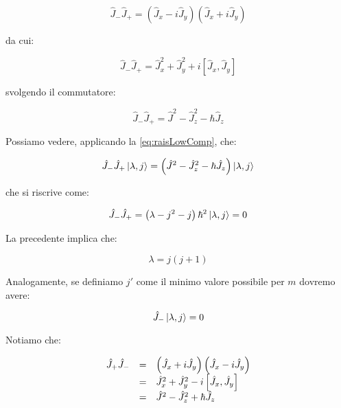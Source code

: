 	\begin{equation}
		\hat{J}_- \hat{J}_+ = \left ( \hat{J}_x - i \hat{J}_y \right ) \left ( \hat{J}_x + i \hat{J}_y \right )
	\end{equation}

da cui:

	\begin{equation}
		\hat{J}_- \hat{J}_+ = \hat{J}^2_x + \hat{J}^2_y + i \left [ \hat{J}_x, \hat{J}_y \right ]
	\end{equation}

svolgendo il commutatore:

	\begin{equation} \label{eq:raisLowComp}
		\hat{J}_- \hat{J}_+	= \hat{J}^2 - \hat{J}_z^2 - \hbar \hat{J}_z
	\end{equation}

Possiamo vedere, applicando la \eqref{eq:raisLowComp}, che:

	\begin{equation}
		\hat{J}_- \hat{J}_+ \ket{\lambda, j} = \left ( \hat{J}^2 - \hat{J}_z^2 - \hbar \hat{J}_z \right ) \ket{\lambda, j}
	\end{equation}

che si riscrive come:

	\begin{equation}
		\hat{J}_- \hat{J}_+ = \left( \lambda - j^2 - j \right ) \hbar^2 \ket{\lambda, j} = 0
	\end{equation}

La precedente implica che:

	\begin{equation} \label{eq:lambdaVinc1}
		\lambda = j ( j + 1 )
	\end{equation}

Analogamente, se definiamo $j'$ come il minimo valore possibile per $m$ dovremo avere:

	\begin{equation}
		\hat{J}_- \ket{\lambda, j} = 0
	\end{equation}

Notiamo che:

	\begin{equation}
		\begin{array}{c c l}
			\hat{J}_+ \hat{J}_- & = & \left ( \hat{J}_x + i \hat{J}_y \right ) \left ( \hat{J}_x - i \hat{J}_y \right ) \\
			& = & \hat{J}^2_x + \hat{J}^2_y - i \left [ \hat{J}_x, \hat{J}_y \right ] \\
			& = & \hat{J}^2 - \hat{J}^2_z + \hbar \hat{J}_z
		\end{array}
	\end{equation}

